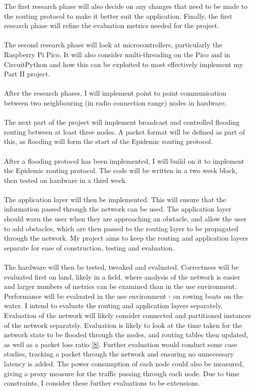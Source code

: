 \documentclass[10pt, a4paper]{article}
\begin{document}
The first research phase will also decide on any changes that need to be made to the routing protocol to make it better suit the application. Finally, the first research phase will refine the evaluation metrics needed for the project. \\ \\
The second research phase will look at microcontrollers, particularly the Raspberry Pi Pico. It will also consider multi-threading on the Pico and in CircuitPython and how this can be exploited to most effectively implement my Part II project. \\ \\
After the research phases, I will implement point to point communication between two neighbouring (in radio connection range) nodes in hardware. \\ \\
The next part of the project will implement broadcast and controlled flooding routing between at least three nodes. A packet format will be defined as part of this, as flooding will form the start of the Epidemic routing protocol.\\ \\
After a flooding protocol has been implemented, I will build on it to implement the Epidemic routing protocol. The code will be written in a two week block, then tested on hardware in a third week. \\ \\
The application layer will then be implemented. This will ensure that the information passed through the network can be used. The application layer should warn the user when they are approaching an obstacle, and allow the user to add obstacles, which are then passed to the routing layer to be propagated through the network. My project aims to keep the routing and application layers separate for ease of construction, testing and evaluation.\\ \\
The hardware will then be tested, tweaked and evaluated. Correctness will be evaluated first on land, likely in a field, where analysis of the network is easier and larger numbers of metrics can be examined than in the use environment. Performance will be evaluated in the use environment - on rowing boats on the water. I intend to evaluate the routing and application layers separately. Evaluation of the network will likely consider connected and partitioned instances of the network separately. Evaluation is likely to look at the time taken for the network state to be flooded through the nodes, and routing tables then updated, as well as a packet loss ratio \hyperref[itu]{[8]}. Further evaluation would conduct some case studies, tracking a packet through the network and ensuring no unnecessary latency is added. The power consumption of each node could also be measured, giving a proxy measure for the traffic passing through each node. Due to time constraints, I consider these further evaluations to be extensions.
\end{document}
